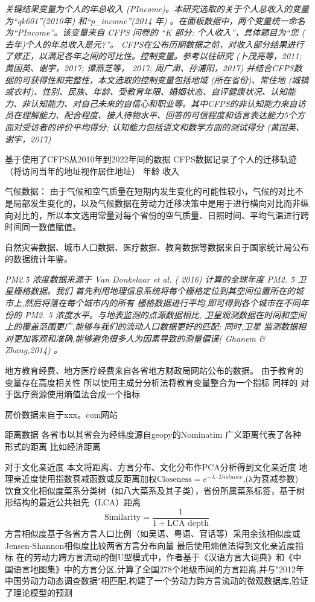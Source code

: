 \documentclass[a4paper,12pt,oneside]{book} %
\begin{document}
\textit{关键结果变量为个人的年总收入 (PIncome)。本研究选取的关于个人总收入的变量为“qk601”(2010年) 和“p\_income”(2014 年) 。在面板数据中，两个变量统一命名为“PIncome”。该变量来自 CFPS 问卷的 “K 部分: 个人收入”，具体题目为“您 ( 去年)个人的年总收入是元?”。
CFPS在公布历期数据之前，对收入部分结果进行了修正，以满足各年之间的可比性。控制变量。参考以往研究 (卜茂亮等，2011; 黄国英、谢宇，2017; 谭燕芝等， 2017; 周广肃、孙浦阳，2017) 并结合CFPS数据的可获得性和完整性，本文选取的控制变量包括地域 (所在省份)、常住地 (城镇或农村)、性别、民族、年龄、受教育年限、婚姻状态、自评健康状况、认知能力、非认知能力、对自己未来的自信心和职业等。其中CFPS的非认知能力来自访员在理解能力、配合程度、接人待物水平、回答的可信程度和语言表达能力5个方面对受访者的评价平均得分; 认知能力包括语文和数学方面的测试得分 (黄国英、谢宇，2017)}


基于使用了CFPS从2010年到2022年间的数据
CFPS数据记录了个人的迁移轨迹（将访问当年的地址视作居住地址）
年龄
收入


气候数据：
由于气候和空气质量在短期内发生变化的可能性较小，气候的对比不是局部发生变化的，以及气候数据在劳动力迁移决策中是用于进行横向对比而非纵向对比的，所以本文选用常量对每个省份的空气质量、日照时间、平均气温进行跨时间同一数值赋值。


自然灾害数据、城市人口数据、医疗数据、教育数据等数据来自于国家统计局公布的数据统计年鉴。

\textit{PM2.5 浓度数据来源于 Van Donkelaar et al. ( 2016) 计算的全球年度 PM2. 5 卫星栅格数据。我们 首先利用地理信息系统将每个栅格定位到其空间位置所在的城市上,然后将落在每个城市内的所有 栅格数据进行平均,即可得到各个城市在不同年份的 PM2. 5 浓度水平。与地表监测的点源数据相比, 卫星观测数据在时间和空间上的覆盖范围更广,能够与我们的流动人口数据更好的匹配; 同时,卫星 监测数据相对更加客观和准确,能够避免很多人为因素导致的测量偏误( Ghanem \& Zhang,2014) 。}


地方教育经费、地方医疗经费来自各省地方财政局网站公布的数据。
由于教育的变量存在高度相关性
所以使用主成分分析法将教育变量整合为一个指标
同样的
对于医疗资源使用熵值法合成一个指标


房价数据来自于xxx。com网站

距离数据
各省市以其省会为经纬度源自geopy的Nominatim
广义距离代表了各种形式的距离 比如经济距离

对于文化亲近度
本文将距离、方言分布、文化分布作PCA分析得到文化亲近度
地理亲近度使用指数衰减函数或反距离加权$\text{Closeness}=e^ {-\lambda \cdot Distance}$,(λ为衰减参数)
饮食文化相似度菜系分类树（如八大菜系及其子类），省份所属菜系标签，基于树形结构的最近公共祖先（LCA）距离
\begin{equation}
  \text{Similarity}=\frac{1}{1+\text{LCA depth}}
\end{equation}
方言相似度基于各省方言人口比例（如吴语、粤语、官话等）采用余弦相似度或Jensen-Shannon相似度比较两省方言分布向量
最后使用熵值法得到文化亲近度指标
在\cite{LiuYuYunLaoDongLiKuaFangYanLiuDongDeDaoUXingMoShi2015}的劳动力跨方言流动的倒U型模式中，作者基于《汉语方言大词典》和《中国语言地图集》中的方言分区,计算了全国278个地级市间的方言距离,并与"2012年中国劳动力动态调查数据"相匹配,构建了一个劳动力跨方言流动的微观数据库,验证了理论模型的预测
\end{document}
